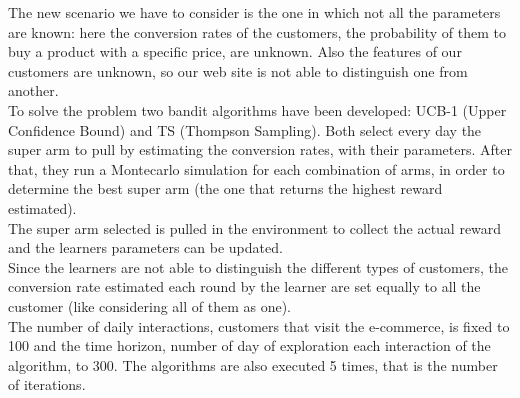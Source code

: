 The new scenario we have to consider is the one in which not all the parameters are known: here the conversion rates of the customers, the probability of them to buy a product with a specific price, are unknown. Also the features of our customers are unknown, so our web site is not able to distinguish one from another. \\
To solve the problem two bandit algorithms have been developed: UCB-1 (Upper Confidence Bound) and TS (Thompson Sampling).
Both select every day the super arm to pull by estimating the conversion rates, with their parameters. After that, they run a Montecarlo simulation for each combination of arms, in order to determine the best super arm (the one that returns the highest reward estimated).\\
The super arm selected is pulled in the environment to collect the actual reward and the learners parameters can be updated.\\
Since the learners are not able to distinguish the different types of customers, the conversion rate estimated each round by the learner are set equally to all the customer (like considering all of them as one).\\
The number of daily interactions, customers that visit the e-commerce, is fixed to 100 and the time horizon, number of day of exploration each interaction of the algorithm, to 300. The algorithms are also executed 5 times, that is the number of iterations.

